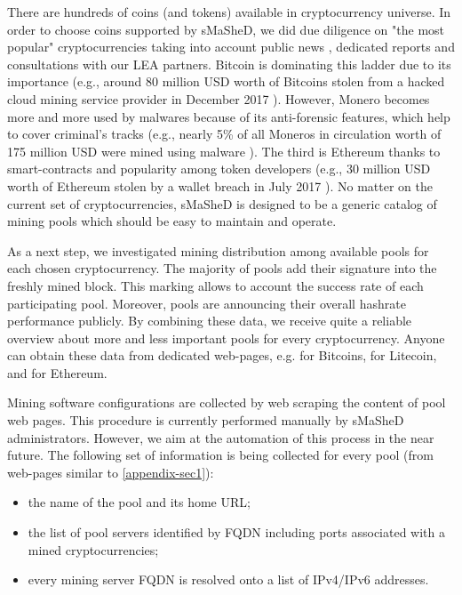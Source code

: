 \documentclass[preprint,12pt,3p]{elsarticle}
\begin{document}
There are hundreds of coins (and tokens) available in cryptocurrency universe. In order to choose coins supported by sMaSheD, we did due diligence on "the most popular" cryptocurrencies taking into account public news \cite{BLOOMBERG}, dedicated reports \cite{CARBON-BLACK} and consultations with our LEA partners. Bitcoin is dominating this ladder due to its importance (e.g., around 80 million USD worth of Bitcoins stolen from a hacked cloud mining service provider in December 2017 \cite{REDDIT-NICEHASH}). However, Monero becomes more and more used by malwares because of its anti-forensic features, which help to cover criminal's tracks (e.g., nearly 5\% of all Moneros in circulation worth of 175 million USD were mined using malware \cite{PALOALTO-MONERO}). The third is Ethereum thanks to smart-contracts and popularity among token developers (e.g., 30 million USD worth of Ethereum stolen by a wallet breach in July 2017 \cite{COINDESK-ETHERSTEAL}). No matter on the current set of cryptocurrencies, sMaSheD is designed to be a generic catalog of mining pools which should be easy to maintain and operate.

As a next step, we investigated mining distribution among available pools for each chosen cryptocurrency. The majority of pools add their signature into the freshly mined block. This marking allows to account the success rate of each participating pool. Moreover, pools are announcing their overall hashrate performance publicly. By combining these data, we receive quite a reliable overview about more and less important pools for every cryptocurrency. Anyone can obtain these data from dedicated web-pages, e.g. \cite{BLOCKCHAININFO-POOLS} for Bitcoins, \cite{LITECOIN-POOLS} for Litecoin, and \cite{ETHERSCAN-POOLS} for Ethereum. 

Mining software configurations are collected by web scraping the content of pool web pages. This procedure is currently performed manually by sMaSheD administrators. However, we aim at the automation of this process in the near future. The following set of information is being collected for every pool (from web-pages similar to \ref{appendix-sec1}):

\begin{itemize}
    \item the name of the pool and its home URL;
    \item the list of pool servers identified by FQDN including ports associated with a mined cryptocurrencies;
    \item every mining server FQDN is resolved onto a list of IPv4/IPv6 addresses.
\end{itemize}
\end{document}
